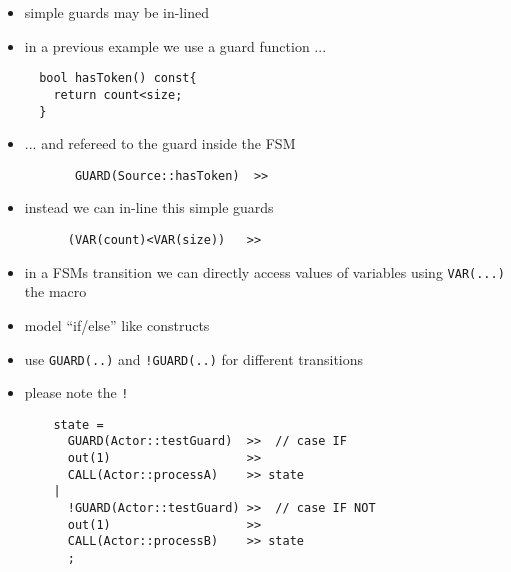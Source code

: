 \begin{frame}[fragile=singleslide]
\begin{itemize}
\item simple guards may be in-lined
\item in a previous example we use a guard function ...
\begin{lstlisting}
  bool hasToken() const{
    return count<size;
  }
\end{lstlisting}
\item ... and refereed to the guard inside the FSM 
\begin{lstlisting}
       GUARD(Source::hasToken)  >>
\end{lstlisting}
\item instead we can in-line this simple guards
\begin{lstlisting}
      (VAR(count)<VAR(size))   >>
\end{lstlisting}
\item in a FSMs transition we can directly access values of variables using \lstinline!VAR(...)! the macro
\end{itemize}
\end{frame}





\begin{frame}[fragile=singleslide]
\begin{itemize}
\item model ``if/else'' like constructs
\item use \lstinline|GUARD(..)| and  \lstinline|!GUARD(..)| for different transitions
\item please note the \lstinline|!|
\begin{lstlisting}
    state = 
      GUARD(Actor::testGuard)  >>  // case IF
      out(1)                   >>
      CALL(Actor::processA)    >> state
    |
      !GUARD(Actor::testGuard) >>  // case IF NOT
      out(1)                   >>
      CALL(Actor::processB)    >> state
      ;
\end{lstlisting}
\end{itemize}
\end{frame}





